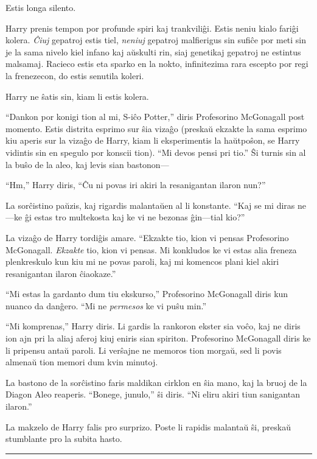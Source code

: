 Estis longa silento.

Harry prenis tempon por profunde spiri kaj trankviliĝi. Estis neniu
kialo fariĝi kolera.  \emph{Ĉiuj} gepatroj estis tiel, \emph{neniuj}
gepatroj malfierigus sin sufiĉe por meti sin je la sama nivelo kiel
infano kaj aŭskulti rin, siaj genetikaj gepatroj ne estintus
malsamaj. Racieco estis eta sparko en la nokto, infinitezima rara
escepto por regi la frenezecon, do estis senutila koleri.

Harry ne ŝatis sin, kiam li estis kolera.

``Dankon por konigi tion al mi, S-iĉo Potter,'' diris Profesorino
McGonagall post momento. Estis distrita esprimo sur ŝia vizaĝo
(preskaŭ ekzakte la sama esprimo kiu aperis sur la vizaĝo de Harry,
kiam li eksperimentis la haŭtpoŝon, se Harry vidintis sin en spegulo
por konscii tion). ``Mi devos pensi pri tio.'' Ŝi turnis sin al la
buŝo de la aleo, kaj levis sian bastonon—

``Hm,'' Harry diris, ``Ĉu ni povas iri akiri la resanigantan ilaron nun?''

La sorĉistino paŭzis, kaj rigardis malantaŭen al li konstante. ``Kaj
se mi diras ne—ke ĝi estas tro multekosta kaj ke vi ne bezonas
ĝin—tial kio?''

La vizaĝo de Harry tordiĝis amare. ``Ekzakte tio, kion vi pensas
Profesorino McGonagall. \emph{Ekzakte} tio, kion vi pensas. Mi
konkludos ke vi estas alia freneza plenkreskulo kun kiu mi ne povas
paroli, kaj mi komencos plani kiel akiri resanigantan ilaron
ĉiaokaze.''

``Mi estas la gardanto dum tiu ekskurso,'' Profesorino McGonagall
diris kun nuanco da danĝero. ``Mi ne \emph{permesos} ke vi puŝu
min.''

``Mi komprenas,'' Harry diris. Li gardis la rankoron ekster sia voĉo,
kaj ne diris ion ajn pri la aliaj aferoj kiuj eniris sian
spiriton. Profesorino McGonagall diris ke li pripensu antaŭ paroli. Li
verŝajne ne memoros tion morgaŭ, sed li povis almenaŭ tion memori dum
kvin minutoj.

La bastono de la sorĉistino faris maldikan cirklon en ŝia mano, kaj la
bruoj de la Diagon Aleo reaperis. ``Bonege, junulo,'' ŝi
diris. ``Ni eliru akiri tiun sanigantan ilaron.''

La makzelo de Harry falis pro surprizo. Poste li rapidis malantaŭ ŝi,
preskaŭ stumblante pro la subita hasto.

\begin{center}\rule{3in}{0.4pt}\end{center}

